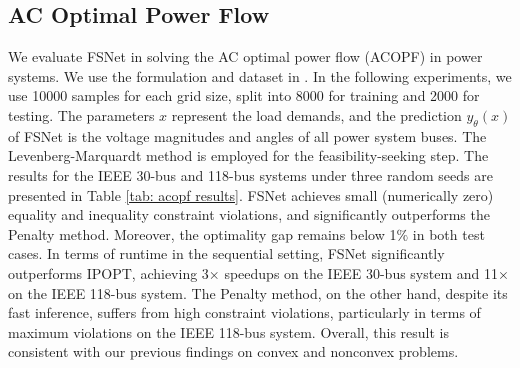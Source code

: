 \documentclass{article}
\newcommand{\todo}[1]{{\color{red} TODO: #1}}
\newcommand{\revise}[1]{{\color{blue} #1}}
\begin{document}
\clearpage

\subsection{AC Optimal Power Flow}
We evaluate FSNet in solving the AC optimal power flow (ACOPF) in power systems. We use the formulation and dataset in \cite{klamkin2025pglearn}.
In the following experiments, we use 10000 samples for each grid size, split into 8000 for training and 2000 for testing.
The parameters $x$ represent the load demands, and the prediction $y_\theta(x)$ of FSNet is the voltage magnitudes and angles of all power system buses.
The Levenberg-Marquardt method is employed for the feasibility-seeking step.
The results for the IEEE 30-bus and 118-bus systems under three random seeds are presented in Table \ref{tab: acopf results}. FSNet achieves small (numerically zero) equality and inequality constraint violations, and significantly outperforms the Penalty method. 
Moreover, the optimality gap remains below 1$\%$ in both test cases. In terms of runtime in the sequential setting, FSNet significantly outperforms IPOPT, achieving 3$\times$ speedups on the IEEE 30-bus system and 11$\times$ on the IEEE 118-bus system. The Penalty method, on the other hand, despite its fast inference, suffers from high constraint violations, particularly in terms of maximum violations on the IEEE 118-bus system. Overall, this result is consistent with our previous findings on convex and nonconvex problems.
\end{document}
